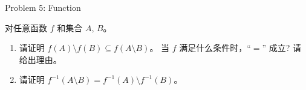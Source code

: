 
\begin{frame}{Problem 5: Function}
  \begin{problem}
    对任意函数 $f$ 和集合 $A$, $B$。
    \begin{enumerate}[(1)]
      \item 请证明 $f(A) \setminus f(B) \subseteq f(A \setminus B)$。
	当 $f$ 满足什么条件时，``$=$'' 成立? 请给出理由。
      \item 请证明 $f^{-1}(A \setminus B) = f^{-1}(A) \setminus f^{-1}(B)$。
    \end{enumerate}
  \end{problem}
\end{frame}
